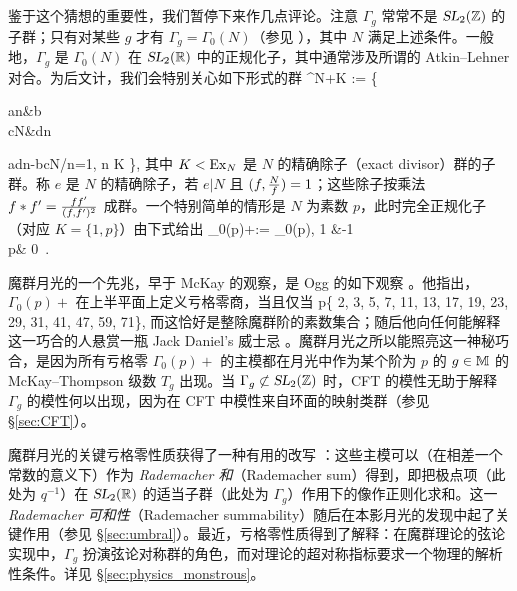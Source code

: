 ~\\~\\
鉴于这个猜想的重要性，我们暂停下来作几点评论。注意 $\Gamma_g$ 常常不是 $\operatorname{\textsl{SL}}_2(\mathbb{Z})$ 的子群；只有对某些 $g$ 才有 $\Gamma_g= \Gamma_0(N)$（参见 ），其中 $N$ 满足上述条件。一般地，$\Gamma_g$ 是 $\Gamma_0(N)$ 在 $\operatorname{\textsl{SL}}_2(\mathbb{R})$ 中的正规化子，其中通常涉及所谓的 Atkin–Lehner 对合。为后文计，我们会特别关心如下形式的群
\be\label{eqn:groupAL}
\Gamma^{N+K} :=
	\left\{
		\begin{pmatrix}
		an&b\\cN&dn
		\end{pmatrix}
		\mid
		adn-bcN/n=1,\;
		 n \in K
	\right\},
\ee
其中 $K<{\rm Ex}_N$ 是 $N$ 的精确除子（exact divisor）群的子群。称 $e$ 是 $N$ 的精确除子，若 $e|N$ 且 $(f,{N\over f})=1$；这些除子按乘法 $f\ast f'  = {ff' \over (f,f')^2}$ 成群。一个特别简单的情形是 $N$ 为素数 $p$，此时完全正规化子（对应 $K=\{1,p\}$）由下式给出
\be
\Gamma_0(p)+:= \Big\langle \Gamma_0(p), {1\over {}} &-1\\ p& 0\eem \Big\rangle ~. 
\ee



魔群月光的一个先兆，早于 McKay 的观察，是 Ogg 的如下观察 \cite{ogg1974automorphismes}。他指出，$\Gamma_0(p)+$ 在上半平面上定义亏格零商，当且仅当
\be
p\in \{ 2, 3, 5, 7, 11, 13, 17, 19, 23, 29, 31, 41, 47, 59, 71\}, 
\ee
而这恰好是整除魔群阶的素数集合；随后他向任何能解释这一巧合的人悬赏一瓶 Jack Daniel's 威士忌 \cite{ogg1974automorphismes}。魔群月光之所以能照亮这一神秘巧合，是因为所有亏格零 $\Gamma_0(p)+$ 的主模都在月光中作为某个阶为 $p$ 的 $g\in \mathbb{M}$ 的 McKay–Thompson 级数 $T_g$ 出现。当 $\Gamma_g\not\subset \operatorname{\textsl{SL}}_2(\mathbb{Z})$ 时，CFT 的模性无助于解释 $\Gamma_g$ 的模性何以出现，因为在 CFT 中模性来自环面的映射类群（参见 \S\ref{sec:CFT}）。


魔群月光的关键亏格零性质获得了一种有用的改写 \cite{DunFre_RSMG}：这些主模可以（在相差一个常数的意义下）作为 \emph{Rademacher 和}（Rademacher sum）得到，即把极点项（此处为 $q^{-1}$）在 $\operatorname{\textsl{SL}}_2(\mathbb{R})$ 的适当子群（此处为 $\Gamma_g$）作用下的像作正则化求和。这一 \emph{Rademacher 可和性}（Rademacher summability）随后在本影月光的发现中起了关键作用（参见 \S\ref{sec:umbral}）。最近，亏格零性质得到了解释：在魔群理论的弦论实现中，$\Gamma_g$ 扮演弦论对称群的角色，而对理论的超对称指标要求一个物理的解析性条件。详见 \S\ref{sec:physics_monstrous}。


